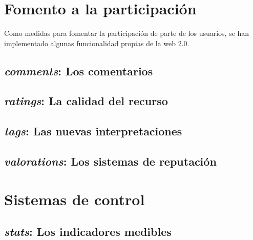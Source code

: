 \section{Fomento a la participación}
Como medidas para fomentar la participación de parte de los usuarios, se han
implementado algunas funcionalidad propias de la web 2.0.

\subsection{\emph{comments}: Los comentarios}
\subsection{\emph{ratings}: La calidad del recurso}
\subsection{\emph{tags}: Las nuevas interpretaciones}
\subsection{\emph{valorations}: Los sistemas de reputación}

\section{Sistemas de control}
\subsection{\emph{stats}: Los indicadores medibles}

